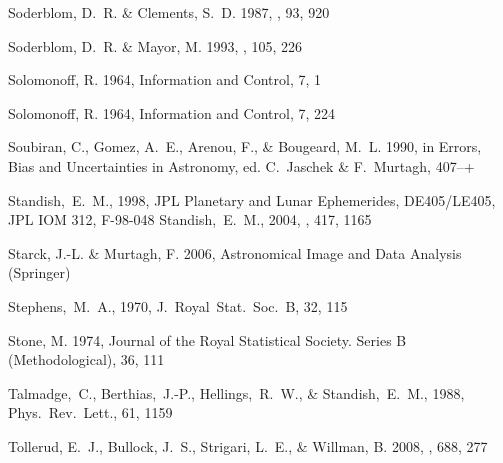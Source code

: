 \begin{thebibliography}{99}
{Soderblom}, D.~R. \& {Clements}, S.~D. 1987, \aj, 93, 920

{Soderblom}, D.~R. \& {Mayor}, M. 1993, \aj, 105, 226

{Solomonoff}, R. 1964{}, {Information and Control}, 7, 1

{Solomonoff}, R. 1964{}, {Information and Control}, 7, 224

{Soubiran}, C., {Gomez}, A.~E., {Arenou}, F., \& {Bougeard}, M.~L. 1990, in
  Errors, Bias and Uncertainties in Astronomy, ed. C.~{Jaschek} \&
  F.~{Murtagh}, 407--+

  Standish,~E.~M., 1998,
  JPL Planetary and Lunar Ephemerides, DE405/LE405,
  JPL IOM 312, F-98-048
  Standish,~E.~M., 2004,
  \aap, 417, 1165

{Starck}, J.-L. \& {Murtagh}, F. 2006, {Astronomical Image and Data Analysis}
  ({Springer})

  Stephens,~M.~A., 1970,
  J.~Royal~Stat.~Soc.~B, 32, 115

{Stone}, M. 1974, Journal of the Royal Statistical Society. Series B
  (Methodological), 36, 111

  Talmadge,~C., Berthias,~J.-P., Hellings,~R.~W., \& Standish,~E.~M., 1988,
  Phys.~Rev.~Lett., 61, 1159

{Tollerud}, E.~J., {Bullock}, J.~S., {Strigari}, L.~E., \& {Willman}, B. 2008,
  \apj, 688, 277


\end{thebibliography}
